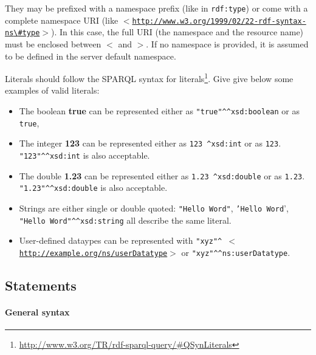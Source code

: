 They may be prefixed with a namespace prefix (like in \texttt{rdf:type}) or
come with a complete namespace URI (like
\texttt{$<$\href{http://www.w3.org/1999/02/22-rdf-syntax-ns\#type}{http://www.w3.org/1999/02/22-rdf-syntax-ns{\textbackslash}\#type}$>$}).
In this case, the full URI (the namespace and the resource name) must be
enclosed between $<$ and $>$. If no namespace is provided, it is assumed to be
defined in the server default namespace.

Literals should follow the SPARQL syntax for
literals\footnote{\url{http://www.w3.org/TR/rdf-sparql-query/\#QSynLiterals}}.
Give give below some examples of valid literals:

\begin{itemize}

    \item  The boolean {\bf true} can be represented either as
    \texttt{"true"\^{ }\^{ }xsd:boolean} or as \texttt{true},

    \item  The integer {\bf 123} can be represented either as \texttt{123\^{
    }\^{ }xsd:int} or as \texttt{123}. \texttt{"123"\^{ }\^{ }xsd:int} is also
    acceptable.

    \item  The double {\bf 1.23} can be represented either as \texttt{1.23\^{
    }\^{ }xsd:double} or as \texttt{1.23}. \texttt{"1.23"\^{ }\^{ }xsd:double}
    is also acceptable.

    \item  Strings are either single or double quoted: \texttt{"Hello Word"},
    \texttt{'Hello Word}', \texttt{"Hello Word"\^{ }\^{ }xsd:string} all
    describe the same literal.

    \item  User-defined dataypes can be represented with \texttt{"xyz"\^{ }\^{
    }$<$\href{http://example.org/ns/userDatatype}{http://example.org/ns/userDatatype}$>$}
    or \texttt{"xyz"\^{ }\^{ }ns:userDatatype}.

\end{itemize}

\subsection{Statements}


\paragraph{General syntax}

